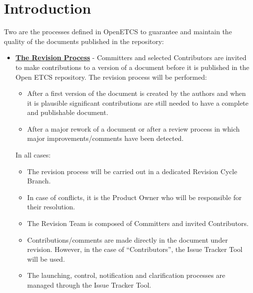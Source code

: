 \documentclass{template/openetcs_article}
\begin{document}
\newpage

\section{Introduction}
Two are the processes defined in OpenETCS to guarantee and maintain the quality of the documents published in the repository:

\begin{itemize}
\item \underline{\textbf{The Revision Process}} -  
Committers and selected Contributors are invited to make contributions to a version of a document before it is published in the Open ETCS repository.
The revision process will be performed:
\begin{itemize}
\item After a first version of the document is created by the authors and when it is plausible significant contributions are still needed to have a complete and publishable document.
\item After a major rework of a document or after a review process in which major improvements/comments have been detected.
\end{itemize}
In all cases:
\begin{itemize}
\item The revision process will be carried out in a dedicated Revision Cycle Branch.
\item In case of conflicts, it is the Product Owner who will be responsible for their resolution.
\item The Revision Team is composed of Committers and invited Contributors.
\item Contributions/comments are made directly in the document under revision. However, in the case of “Contributors”, the Issue Tracker Tool will be used.
\item The launching, control, notification and clarification processes are managed through the Issue Tracker Tool.
\end{itemize}


\end{itemize}
\end{document}
